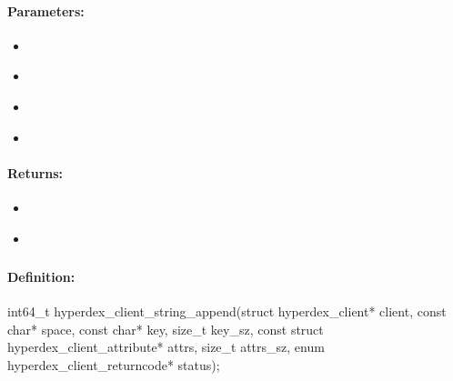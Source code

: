 \paragraph{Parameters:}
\begin{itemize}[noitemsep]
\item {}\\

\item {}\\

\item {}\\

\item {}\\

\end{itemize}

\paragraph{Returns:}
\begin{itemize}[noitemsep]
\item {}\\

\item {}\\

\end{itemize}

\pagebreak
\subsubsection{}
\label{api:c:string_append}


\paragraph{Definition:}
\begin{ccode}
int64_t hyperdex_client_string_append(struct hyperdex_client* client,
        const char* space,
        const char* key, size_t key_sz,
        const struct hyperdex_client_attribute* attrs, size_t attrs_sz,
        enum hyperdex_client_returncode* status);
\end{ccode}

